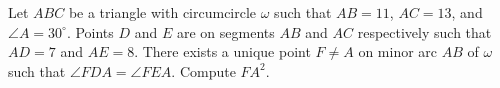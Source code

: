 Let $ABC$ be a triangle with circumcircle $\omega$ such that $AB=11$, $AC=13$, and $\angle{A}=30^\circ$. Points $D$ and $E$ are on segments $AB$ and $AC$ respectively such that $AD=7$ and $AE=8$. There exists a unique point $F\neq A$ on minor arc $AB$ of $\omega$ such that $\angle{FDA}=\angle{FEA}$. Compute $FA^2$.
